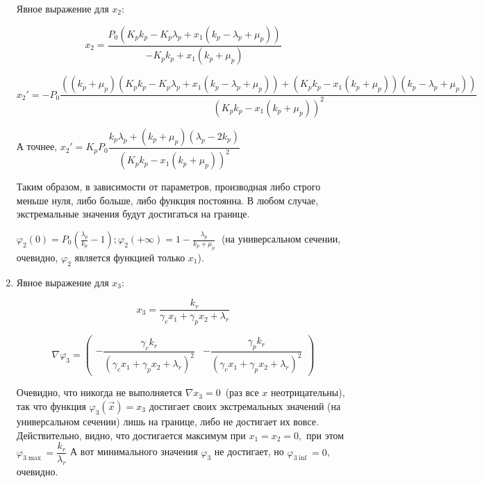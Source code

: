 \documentclass[12pt,a4paper]{article}
\begin{document}
\begin{enumerate}
    Явное выражение для $x_2$:
    
        
        $$ x_2 = \frac{P_{0} \left(K_{p} k_{p} - K_{p} \lambda_{p} + x_{1} \left(k_{p} - \lambda_{p} + \mu_{p}\right)\right)}{- K_{p} k_{p} + x_{1} \left(k_{p} + \mu_{p}\right)}$$
    
        
        $$ x_2' = - P_{0}\dfrac{ \left(\left(k_{p} + \mu_{p}\right) \left(K_{p} k_{p} - K_{p} \lambda_{p} + x_{1} \left(k_{p} - \lambda_{p} + \mu_{p}\right)\right) + \left(K_{p} k_{p} - x_{1} \left(k_{p} + \mu_{p}\right)\right) \left(k_{p} - \lambda_{p} + \mu_{p}\right)\right)}{\left(K_{p} k_{p} - x_{1} \left(k_{p} + \mu_{p}\right)\right)^{2}} $$
    
        
        А точнее, $ x_2' = K_p P_0  \dfrac{k_p\lambda_p + (k_p + \mu_p)(\lambda_p - 2k_p)}{\left( K_p  k_p - x_1 \left(k_p + \mu_p\right)\right)^{2}}  $
    
    Таким образом, в зависимости от параметров, производная либо строго
    меньше нуля, либо больше, либо функция постоянна. В любом случае,
    экстремальные значения будут достигаться на границе.
    
    \(\varphi_2(0) = P_0 \left( \frac{\lambda_p}{k_p} - 1\right);  \varphi_2(+\!\infty) = 1 - \frac{\lambda_p}{k_p + \mu_p}\;\)
    (на универсальном сечении, очевидно, \(\varphi_2\) является функцией
    только \(x_1\)). 



    \item Явное выражение для $x_3$:

        
        $$ x_3 = \frac{k_{r}}{\gamma_{c} x_{1} + \gamma_{p} x_{2} + \lambda_{r}}$$

        
        $$
        \nabla \varphi_3 = \left(\begin{matrix}- \dfrac{\gamma_{c} k_{r}}{\left(\gamma_{c} x_{1} + \gamma_{p} x_{2} + \lambda_{r}\right)^{2}} 
        &
        - \dfrac{\gamma_{p} k_{r}}{\left(\gamma_{c} x_{1} + \gamma_{p} x_{2} + \lambda_{r}\right)^{2}}\end{matrix}\right) 
        $$

        
    Очевидно, что никогда не выполняется \(\nabla x_3 = 0\,\) (раз все \(x\) неотрицательны), так что функция \(\varphi_3(\vec{x}) = x_3\) достигает своих экстремальных значений (на универсальном сечении) лишь на границе, либо не достигает их вовсе. Действительно, видно, что достигается максимум при \(x_1 = x_2 = 0,\) при этом \(\varphi_{3 \max} = \dfrac{k_r}{\lambda_r}\) А вот минимального значения \(\varphi_3\) не достигает, но \(\varphi_{3 \inf} = 0\), очевидно.


\end{enumerate}
\end{document}
